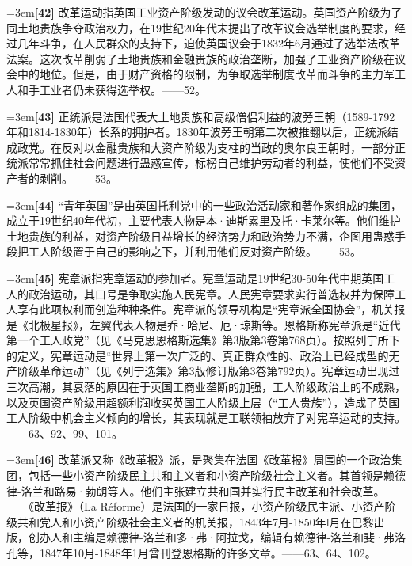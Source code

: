 \documentclass[UTF8,zihao=-4,a4paper]{ctexart}
\begin{document}
\noindent\hangindent=3em\textbf{[42]} 改革运动指英国工业资产阶级发动的议会改革运动。英国资产阶级为了同土地贵族争夺政治权力，在19世纪20年代末提出了改革议会选举制度的要求，经过几年斗争，在人民群众的支持下，迫使英国议会于1832年6月通过了选举法改革法案。这次改革削弱了土地贵族和金融贵族的政治垄断，加强了工业资产阶级在议会中的地位。但是，由于财产资格的限制，为争取选举制度改革而斗争的主力军工人和手工业者仍未获得选举权。——52。\par
\noindent\hangindent=3em\textbf{[43]} 正统派是法国代表大土地贵族和高级僧侣利益的波旁王朝（1589-1792年和1814-1830年）长系的拥护者。1830年波旁王朝第二次被推翻以后，正统派结成政党。在反对以金融贵族和大资产阶级为支柱的当政的奥尔良王朝时，一部分正统派常常抓住社会问题进行蛊惑宣传，标榜自己维护劳动者的利益，使他们不受资产者的剥削。——53。\par
\noindent\hangindent=3em\textbf{[44]} “青年英国”是由英国托利党中的一些政治活动家和著作家组成的集团，成立于19世纪40年代初，主要代表人物是本·迪斯累里及托·卡莱尔等。他们维护土地贵族的利益，对资产阶级日益增长的经济势力和政治势力不满，企图用蛊惑手段把工人阶级置于自己的影响之下，并利用他们反对资产阶级。——53。\par
\noindent\hangindent=3em\textbf{[45]} 宪章派指宪章运动的参加者。宪章运动是19世纪30-50年代中期英国工人的政治运动，其口号是争取实施人民宪章。人民宪章要求实行普选权并为保障工人享有此项权利而创造种种条件。宪章派的领导机构是“宪章派全国协会”，机关报是《北极星报》，左翼代表人物是乔·哈尼、厄·琼斯等。恩格斯称宪章派是“近代第一个工人政党”（见《马克思恩格斯选集》第3版第3卷第768页）。按照列宁所下的定义，宪章运动是“世界上第一次广泛的、真正群众性的、政治上已经成型的无产阶级革命运动”（见《列宁选集》第3版修订版第3卷第792页）。宪章运动出现过三次高潮，其衰落的原因在于英国工商业垄断的加强，工人阶级政治上的不成熟，以及英国资产阶级用超额利润收买英国工人阶级上层（“工人贵族”），造成了英国工人阶级中机会主义倾向的增长，其表现就是工联领袖放弃了对宪章运动的支持。——63、92、99、101。\par
\noindent\hangindent=3em\textbf{[46]} 改革派又称《改革报》派，是聚集在法国《改革报》周围的一个政治集团，包括一些小资产阶级民主共和主义者和小资产阶级社会主义者。其首领是赖德律-洛兰和路易·勃朗等人。他们主张建立共和国并实行民主改革和社会改革。  　　《改革报》（La Réforme）是法国的一家日报，小资产阶级民主派、小资产阶级共和党人和小资产阶级社会主义者的机关报，1843年7月-1850年l月在巴黎出版，创办人和主编是赖德律-洛兰和多·弗·阿拉戈，编辑有赖德律-洛兰和斐·弗洛孔等，1847年10月-1848年1月曾刊登恩格斯的许多文章。——63、64、102。\par
\end{document}
